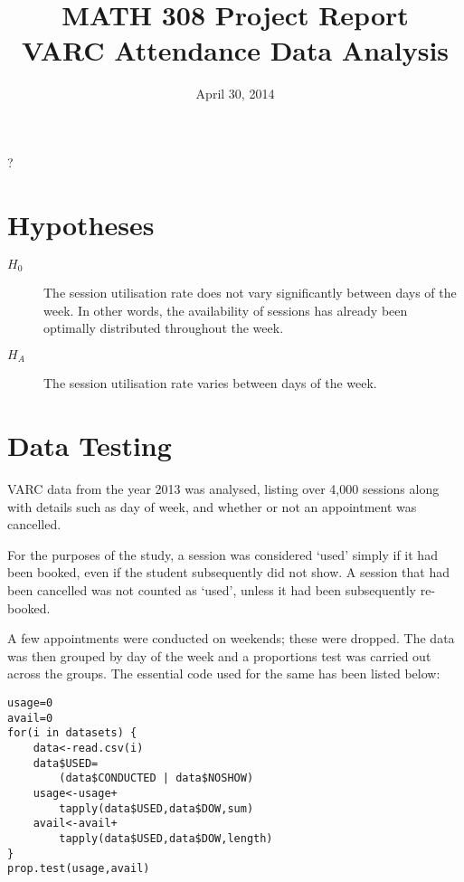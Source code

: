 \documentclass[twocolumn]{article}
\title{MATH 308 Project Report\\VARC Attendance Data Analysis}
\date{April 30, 2014}
\begin{document}
\maketitle
\thispagestyle{empty}?


\section{Hypotheses}
\begin{description}
	\item[$H_0$] The session utilisation rate does not vary significantly between days of the week. In other words, the availability of sessions has already been optimally distributed throughout the week.
	\item[$H_A$] The session utilisation rate varies between days of the week.
\end{description}

\section{Data Testing}
VARC data from the year 2013 was analysed, listing over 4,000 sessions along with details such as day of week, and whether or not an appointment was cancelled.

For the purposes of the study, a session was considered `used' simply if it had been booked, even if the student subsequently did not show. A session that had been cancelled was not counted as `used', unless it had been subsequently re-booked.

A few appointments were conducted on weekends; these were dropped. The data was then grouped by day of the week and a proportions test was carried out across the groups. The essential  code used for the same has been listed below:

\begin{lstlisting}
usage=0
avail=0
for(i in datasets) {
	data<-read.csv(i)
	data$USED=
		(data$CONDUCTED | data$NOSHOW)
	usage<-usage+
		tapply(data$USED,data$DOW,sum)
	avail<-avail+
		tapply(data$USED,data$DOW,length)
}
prop.test(usage,avail)
\end{lstlisting}
\vspace{-1.5em}
\end{document}

